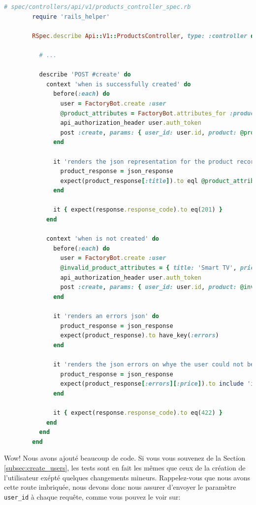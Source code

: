 \documentclass[]{report}
\begin{document}
      \begin{scriptsize}
        \begin{lstlisting}[language=ruby, caption={Test de la création d'un produit}, label={lst:create_create_products_controller_spec}]
        # spec/controllers/api/v1/products_controller_spec.rb
        require 'rails_helper'

        RSpec.describe Api::V1::ProductsController, type: :controller do

          # ...

          describe 'POST #create' do
            context 'when is successfully created' do
              before(:each) do
                user = FactoryBot.create :user
                @product_attributes = FactoryBot.attributes_for :product
                api_authorization_header user.auth_token
                post :create, params: { user_id: user.id, product: @product_attributes }
              end

              it 'renders the json representation for the product record just created' do
                product_response = json_response
                expect(product_response[:title]).to eql @product_attributes[:title]
              end

              it { expect(response.response_code).to eq(201) }
            end

            context 'when is not created' do
              before(:each) do
                user = FactoryBot.create :user
                @invalid_product_attributes = { title: 'Smart TV', price: 'Twelve dollars' }
                api_authorization_header user.auth_token
                post :create, params: { user_id: user.id, product: @invalid_product_attributes }
              end

              it 'renders an errors json' do
                product_response = json_response
                expect(product_response).to have_key(:errors)
              end

              it 'renders the json errors on whye the user could not be created' do
                product_response = json_response
                expect(product_response[:errors][:price]).to include 'is not a number'
              end

              it { expect(response.response_code).to eq(422) }
            end
          end
        end
        \end{lstlisting}
      \end{scriptsize}


      Wow! Nous avons ajouté beaucoup de code. Si vous vous souvenez de la Section \ref{subsec:create_users}, les tests sont en fait les mêmes que ceux de la création de l'utilisateur exépté quelques changements mineurs. Rappelez-vous que nous avons cette route imbriquée, nous devons donc nous assurer d'envoyer le paramètre \verb|user_id| à chaque requête, comme vous pouvez le voir sur:
\end{document}
